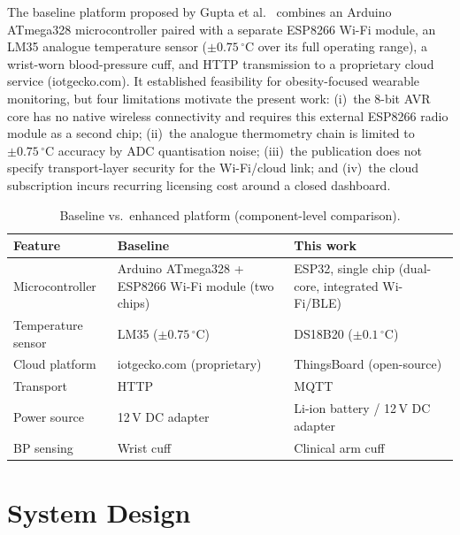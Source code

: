 \documentclass[pdflatex,sn-mathphys-num]{sn-jnl}
\begin{document}
The baseline platform proposed by Gupta et al.~\cite{gupta2020}
combines an Arduino ATmega328 microcontroller paired with a separate
ESP8266 Wi-Fi module, an LM35 analogue temperature sensor
($\pm0.75\,^\circ$C over its full operating range), a wrist-worn
blood-pressure cuff, and HTTP transmission to a proprietary cloud
service (iotgecko.com). It established feasibility for
obesity-focused wearable monitoring, but four limitations motivate
the present work: (i)~the 8-bit AVR core has no native wireless
connectivity and requires this external ESP8266 radio module as a
second chip; (ii)~the analogue thermometry chain is limited to
$\pm0.75\,^\circ$C
accuracy by ADC quantisation noise; (iii)~the publication does not
specify transport-layer security for the Wi-Fi/cloud link; and
(iv)~the cloud subscription incurs recurring licensing cost around a
closed dashboard.

\begin{table}[!htb]
\caption{Baseline vs.\ enhanced platform (component-level comparison).}\label{tab:compare}
\centering
\tiny
\begin{tabular}{@{}p{2.8cm}p{4.2cm}p{4.6cm}@{}}
\toprule
\textbf{Feature} & \textbf{Baseline~\cite{gupta2020}} & \textbf{This work}\\
\midrule
Microcontroller     & Arduino ATmega328 + ESP8266 Wi-Fi module (two chips) & ESP32, single chip (dual-core, integrated Wi-Fi/BLE)\\
Temperature sensor   & LM35 ($\pm0.75\,^\circ$C) & DS18B20 ($\pm0.1\,^\circ$C)\\
Cloud platform       & iotgecko.com (proprietary) & ThingsBoard (open-source)\\
Transport             & HTTP     & MQTT\footnotemark[1]\\
Power source          & 12\,V DC adapter       & Li-ion battery / 12\,V DC adapter\\
BP sensing             & Wrist cuff              & Clinical arm cuff\\
\bottomrule
\end{tabular}
\end{table}

\section{System Design}\label{sec:design}
\end{document}
